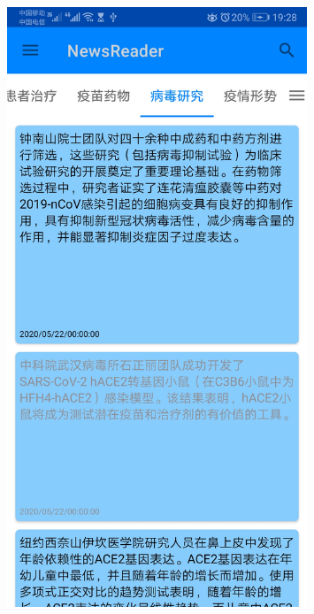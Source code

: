 \documentclass[UTF8]{article}
\begin{document}
\begin{figure}[htbp]
{\begin{minipage}[t]{0.25\linewidth}
    \includegraphics[width=0.8\textwidth]{cluster3.jpg}
    \end{minipage}%
    }%
\end{figure}
\end{document}
